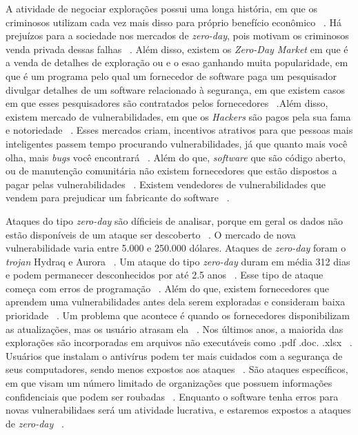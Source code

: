 \documentclass[brazil, utf8]{article}
\begin{document}
A atividade de negociar explorações possui uma longa história, em que os criminosos utilizam cada vez mais disso
para próprio benefício econômico ~\cite{Egelman:2013}. Há prejuízos para a sociedade nos mercados de \textit{zero-day},
pois motivam os criminosos venda privada dessas falhas ~\cite{Egelman:2013}. Além disso, existem os \textit{Zero-Day 
Market} em que é a venda de detalhes de exploração ou  e o  esao 
ganhando muita popularidade, em que  é um programa pelo qual um fornecedor de software paga um pesquisador divulgar 
detalhes de um software relacionado à segurança, em que existem casos em que esses pesquisadores são contratados pelos 
fornecedores ~\cite{Egelman:2013}.Além disso, existem mercado de vulnerabilidades, em que os \textit{Hackers} são pagos 
pela sua fama e notoriedade ~\cite{Egelman:2013}. Esses mercados criam, incentivos atrativos para que pessoas mais 
inteligentes passem tempo procurando vulnerabilidades, já que quanto mais você olha, mais \textit{bugs} você encontrará 
~\cite{Egelman:2013}. Além do que, \textit{software} que são código aberto, ou de manutenção comunitária não existem 
fornecedores que estão dispostos a pagar pelas vulnerabilidades ~\cite{Egelman:2013}. Existem vendedores de 
vulnerabilidades que vendem para prejudicar um fabricante do software ~\cite{Egelman:2013}.

Ataques do tipo \textit{zero-day} são díficieis de analisar, porque em geral os dados não estão disponíveis de um 
ataque ser descoberto ~\cite{Bilge:2012}. O mercado de nova vulnerabilidade varia entre 5.000 e 250.000 dólares. 
Ataques de \textit{zero-day} foram o \textit{trojan} Hydraq e Aurora ~\cite{Bilge:2012}. Um ataque do tipo
\textit{zero-day} duram em média 312 dias e podem permanecer desconhecidos por até 2.5 anos ~\cite{Bilge:2012}.
Esse tipo de ataque começa com erros de programação ~\cite{Bilge:2012}. Além do que, existem fornecedores que aprendem 
uma vulnerabilidades antes dela serem exploradas e consideram baixa prioridade ~\cite{Bilge:2012}. Um problema que 
acontece é quando os fornecedores disponibilizam as atualizações, mas os usuário atrasam ela ~\cite{Bilge:2012}. Nos 
últimos anos, a maiorida das explorações são incorporadas em arquivos não executáveis como .pdf .doc. .xlsx 
~\cite{Bilge:2012}. Usuários que instalam o antivírus podem ter mais cuidados com a segurança de seus computadores, 
sendo menos expostos aos ataques ~\cite{Bilge:2012}. São ataques específicos, em que visam um número limitado de 
organizações que possuem informações confidenciais que podem ser roubadas ~\cite{Bilge:2012}. Enquanto o software tenha 
erros para novas vulnerabilidaes será um atividade lucrativa, e estaremos expostos a ataques de \textit{zero-day}
~\cite{Bilge:2012}.




\end{document}
